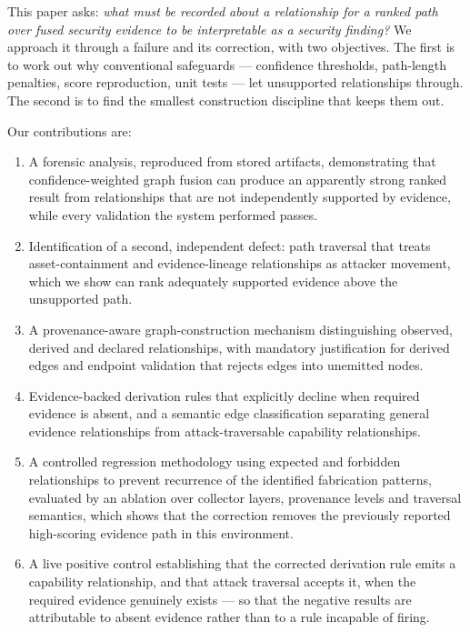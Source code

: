 \documentclass[11pt,a4paper]{article}
\begin{document}
This paper asks: \emph{what must be recorded about a relationship for a ranked path over fused security evidence to be interpretable as a security finding?} We approach it through a failure and its correction, with two objectives. The first is to work out why conventional safeguards --- confidence thresholds, path-length penalties, score reproduction, unit tests --- let unsupported relationships through. The second is to find the smallest construction discipline that keeps them out.

Our contributions are:
\begin{enumerate}[leftmargin=*]
\item A forensic analysis, reproduced from stored artifacts, demonstrating that confidence-weighted graph fusion can produce an apparently strong ranked result from relationships that are not independently supported by evidence, while every validation the system performed passes.
\item Identification of a second, independent defect: path traversal that treats asset-containment and evidence-lineage relationships as attacker movement, which we show can rank adequately supported evidence above the unsupported path.
\item A provenance-aware graph-construction mechanism distinguishing observed, derived and declared relationships, with mandatory justification for derived edges and endpoint validation that rejects edges into unemitted nodes.
\item Evidence-backed derivation rules that explicitly decline when required evidence is absent, and a semantic edge classification separating general evidence relationships from attack-traversable capability relationships.
\item A controlled regression methodology using expected and forbidden relationships to prevent recurrence of the identified fabrication patterns, evaluated by an ablation over collector layers, provenance levels and traversal semantics, which shows that the correction removes the previously reported high-scoring evidence path in this environment.
\item A live positive control establishing that the corrected derivation rule emits a capability relationship, and that attack traversal accepts it, when the required evidence genuinely exists --- so that the negative results are attributable to absent evidence rather than to a rule incapable of firing.
\end{enumerate}
\end{document}
